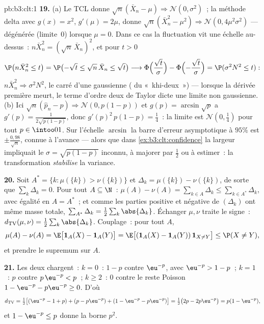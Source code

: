 \begin{solution}{pb:b3:clt:1}
\textbf{19.} (a) Le TCL donne $\sqrt n(\bar X_n - \mu)
\Rightarrow \mathcal N(0, \sigma^2)$~; la méthode delta avec
$g(x) = x^2$, $g'(\mu) = 2\mu$, donne $\sqrt n(\bar X_n^2 -
\mu^2) \Rightarrow \mathcal N(0, 4\mu^2\sigma^2)$ ---
dégénérée (limite~$0$) lorsque $\mu = 0$. Dans ce cas la
fluctuation vit une échelle au-dessus~: $n\bar X_n^2 =
(\sqrt n\,\bar X_n)^2$, et pour $t > 0$
\[
\P\bigl(n\bar X_n^2 \leq t\bigr) = \P\bigl(-\sqrt t \leq
\sqrt n\,\bar X_n \leq \sqrt t\bigr) \longrightarrow
\Phi\Bigl(\frac{\sqrt t}\sigma\Bigr) -
\Phi\Bigl(-\frac{\sqrt t}\sigma\Bigr) = \P(\sigma^2N^2
\leq t) :
\]
$n\bar X_n^2 \Rightarrow \sigma^2N^2$, le carré d'une
gaussienne ( du «~khi-deux~») --- lorsque la dérivée
première meurt, le terme d'ordre deux de Taylor dicte une
limite non gaussienne. (b) Ici $\sqrt n(\hat p_n - p)
\Rightarrow \mathcal N(0, p(1 - p))$ et $g(p) =
\arcsin\sqrt p$ a $g'(p) = \frac1{2\sqrt{p(1 - p)}}$, donc
$g'(p)^2\,p(1 - p) = \frac14$~: la limite est $\mathcal
N(0, \frac14)$ pour tout $p \in \intoo01$. Sur l'échelle
$\arcsin$ la barre d'erreur asymptotique à $95\%$ est $\pm
\frac{0{,}98}{\sqrt n}$, connue à l'avance --- alors que
dans \cref{ex:b3:clt:confidence} la largeur impliquait le
$\sigma = \sqrt{p(1-p)}$ inconnu, à majorer par $\frac12$ ou
à estimer~: la transformation \emph{stabilise} la variance.

\textbf{20.} Soit $A^* = \{k : \mu(\{k\}) > \nu(\{k\})\}$ et
$\Delta_k = \mu(\{k\}) - \nu(\{k\})$, de sorte que
$\sum_k\Delta_k = 0$. Pour tout $A \subseteq \N$~: $\mu(A) -
\nu(A) = \sum_{k\in A}\Delta_k \leq \sum_{k\in
A^*}\Delta_k$, avec égalité en $A = A^*$~; et comme les
parties positive et négative de $(\Delta_k)$ ont même masse
totale, $\sum_{A^*}\Delta_k = \frac12\sum_k\abs{\Delta_k}$.
Échanger $\mu, \nu$ traite le signe~: $d_{\mathrm{TV}}(\mu,
\nu) = \frac12\sum_k\abs{\Delta_k}$. Couplage~: pour tout
$A$,
\[
\mu(A) - \nu(A) = \E\bigl[\mathbf 1_A(X) - \mathbf
1_A(Y)\bigr] = \E\bigl[(\mathbf 1_A(X) - \mathbf
1_A(Y))\,\mathbf 1_{X\neq Y}\bigr] \leq \P(X \neq Y),
\]
et prendre le supremum sur $A$.

\textbf{21.} Les deux  chargent~: $k = 0$~: $1 - p$ contre
$\eu^{-p}$, avec $\eu^{-p} > 1 - p$~; $k = 1$~: $p$ contre
$p\,\eu^{-p} < p$~; $k \geq 2$~: $0$ contre le reste Poisson
$1 - \eu^{-p} - p\eu^{-p} \geq 0$. D'où
\[
d_{\mathrm{TV}} = \tfrac12\bigl[(\eu^{-p} - 1 + p) + (p -
p\eu^{-p}) + (1 - \eu^{-p} - p\eu^{-p})\bigr] =
\tfrac12\bigl(2p - 2p\eu^{-p}\bigr) = p(1 - \eu^{-p}),
\]
et $1 - \eu^{-p} \leq p$ donne la borne $p^2$.


\end{solution}
